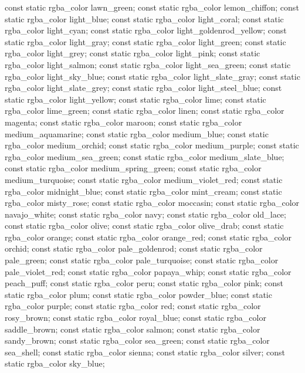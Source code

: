 \begin{codeblock}
{{    const static rgba_color lawn_green;
    const static rgba_color lemon_chiffon;
    const static rgba_color light_blue;
    const static rgba_color light_coral;
    const static rgba_color light_cyan;
    const static rgba_color light_goldenrod_yellow;
    const static rgba_color light_gray;
    const static rgba_color light_green;
    const static rgba_color light_grey;
    const static rgba_color light_pink;
    const static rgba_color light_salmon;
    const static rgba_color light_sea_green;
    const static rgba_color light_sky_blue;
    const static rgba_color light_slate_gray;
    const static rgba_color light_slate_grey;
    const static rgba_color light_steel_blue;
    const static rgba_color light_yellow;
    const static rgba_color lime;
    const static rgba_color lime_green;
    const static rgba_color linen;
    const static rgba_color magenta;
    const static rgba_color maroon;
    const static rgba_color medium_aquamarine;
    const static rgba_color medium_blue;
    const static rgba_color medium_orchid;
    const static rgba_color medium_purple;
    const static rgba_color medium_sea_green;
    const static rgba_color medium_slate_blue;
    const static rgba_color medium_spring_green;
    const static rgba_color medium_turquoise;
    const static rgba_color medium_violet_red;
    const static rgba_color midnight_blue;
    const static rgba_color mint_cream;
    const static rgba_color misty_rose;
    const static rgba_color moccasin;
    const static rgba_color navajo_white;
    const static rgba_color navy;
    const static rgba_color old_lace;
    const static rgba_color olive;
    const static rgba_color olive_drab;
    const static rgba_color orange;
    const static rgba_color orange_red;
    const static rgba_color orchid;
    const static rgba_color pale_goldenrod;
    const static rgba_color pale_green;
    const static rgba_color pale_turquoise;
    const static rgba_color pale_violet_red;
    const static rgba_color papaya_whip;
    const static rgba_color peach_puff;
    const static rgba_color peru;
    const static rgba_color pink;
    const static rgba_color plum;
    const static rgba_color powder_blue;
    const static rgba_color purple;
    const static rgba_color red;
    const static rgba_color rosy_brown;
    const static rgba_color royal_blue;
    const static rgba_color saddle_brown;
    const static rgba_color salmon;
    const static rgba_color sandy_brown;
    const static rgba_color sea_green;
    const static rgba_color sea_shell;
    const static rgba_color sienna;
    const static rgba_color silver;
    const static rgba_color sky_blue;
}}
\end{codeblock}
